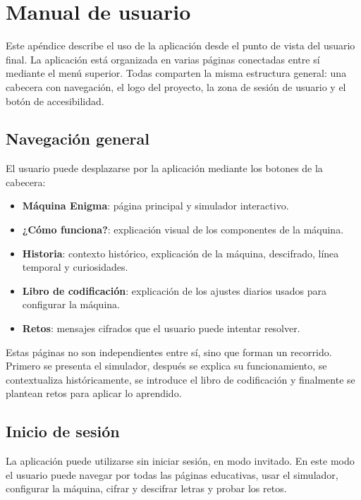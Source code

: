 \chapter{Manual de usuario}
\label{apendice_manual_usuario}

Este apéndice describe el uso de la aplicación desde el punto de vista del usuario final. La aplicación está organizada en varias páginas conectadas entre sí mediante el menú superior. Todas comparten la misma estructura general: una cabecera con navegación, el logo del proyecto, la zona de sesión de usuario y el botón de accesibilidad.

\section{Navegación general}

El usuario puede desplazarse por la aplicación mediante los botones de la cabecera:

\begin{itemize}
	\item \textbf{Máquina Enigma}: página principal y simulador interactivo.
	\item \textbf{¿Cómo funciona?}: explicación visual de los componentes de la máquina.
	\item \textbf{Historia}: contexto histórico, explicación de la máquina, descifrado, línea temporal y curiosidades.
	\item \textbf{Libro de codificación}: explicación de los ajustes diarios usados para configurar la máquina.
	\item \textbf{Retos}: mensajes cifrados que el usuario puede intentar resolver.
\end{itemize}

Estas páginas no son independientes entre sí, sino que forman un recorrido. Primero se presenta el simulador, después se explica su funcionamiento, se contextualiza históricamente, se introduce el libro de codificación y finalmente se plantean retos para aplicar lo aprendido.

\section{Inicio de sesión}

La aplicación puede utilizarse sin iniciar sesión, en modo invitado. En este modo el usuario puede navegar por todas las páginas educativas, usar el simulador, configurar la máquina, cifrar y descifrar letras y probar los retos.


